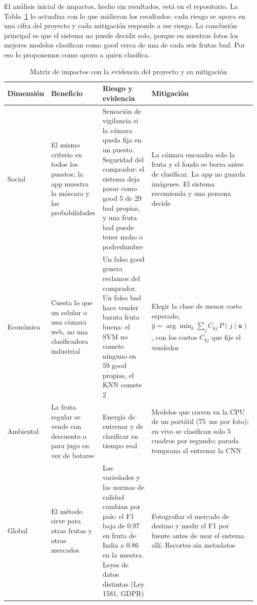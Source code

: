 \documentclass[conference]{IEEEtran}
\begin{document}
El análisis inicial de impactos, hecho sin resultados, está en el repositorio. La Tabla~\ref{tab:impactos} lo actualiza con lo que midieron los resultados: cada riesgo se apoya en una cifra del proyecto y cada mitigación responde a ese riesgo. La conclusión principal es que el sistema no puede decidir solo, porque en nuestras fotos los mejores modelos clasifican como good cerca de una de cada seis frutas bad. Por eso lo proponemos como apoyo a quien clasifica.

\begin{table}[t]
\caption{Matriz de impactos con la evidencia del proyecto y su mitigación}
\label{tab:impactos}
\centering
\scriptsize
\setlength{\tabcolsep}{3pt}
\begin{tabular}{p{1.15cm}p{1.9cm}p{2.25cm}p{2.3cm}}
\toprule
Dimensión & Beneficio & Riesgo y evidencia & Mitigación \\
\midrule
Social & El mismo criterio en todos los puestos; la app muestra la máscara y las probabilidades & Sensación de vigilancia si la cámara queda fija en un puesto. Seguridad del comprador: el sistema deja pasar como good 5 de 29 bad propias, y una fruta bad puede tener moho o podredumbre & La cámara encuadra solo la fruta y el fondo se borra antes de clasificar. La app no guarda imágenes. El sistema recomienda y una persona decide \\
Económica & Cuesta lo que un celular o una cámara web, no una clasificadora industrial & Un falso good genera reclamos del comprador. Un falso bad hace vender barata fruta buena: el SVM no comete ninguno en 59 good propias, el KNN comete 2 & Elegir la clase de menor costo esperado, $\hat y=\arg\min_k\allowbreak\sum_j C_{kj}\,P(j\mid\mathbf{x})$, con los costos $C_{kj}$ que fije el vendedor \\
Ambiental & La fruta regular se vende con descuento o para jugo en vez de botarse & Energía de entrenar y de clasificar en tiempo real & Modelos que corren en la CPU de un portátil (75~ms por foto); en vivo se clasifican solo 5 cuadros por segundo; parada temprana al entrenar la CNN \\
Global & El método sirve para otras frutas y otros mercados & Las variedades y las normas de calidad cambian por país: el F1 baja de 0.97 en fruta de India a 0.86 en la nuestra. Leyes de datos distintas (Ley 1581, GDPR) & Fotografiar el mercado de destino y medir el F1 por fuente antes de usar el sistema allí. Recortes sin metadatos \\
\bottomrule
\end{tabular}
\end{table}
\end{document}
